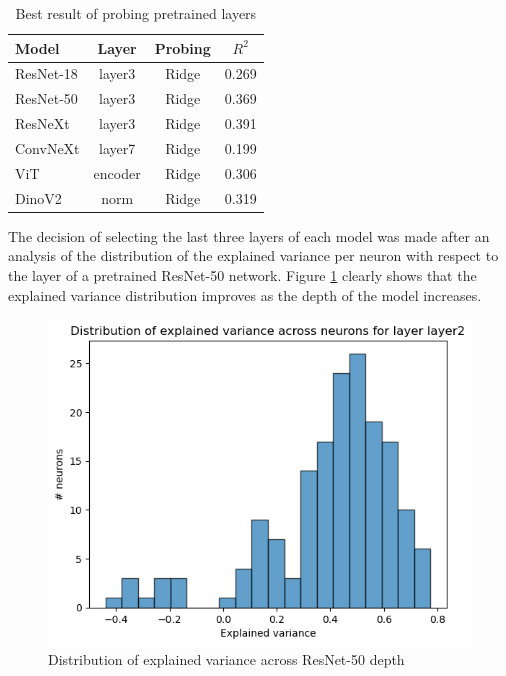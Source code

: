 \documentclass[10pt,conference,compsocconf]{IEEEtran}
\begin{document}
\begin{table}[h!]
    \centering
    \begin{tabular}{|l|c|c|c|}
        \hline
        Model & Layer & Probing & \(R^2\) \\
        \hline
        ResNet-18 & layer3 & Ridge & 0.269 \\
        ResNet-50 & layer3 & Ridge & 0.369 \\
        ResNeXt & layer3 & Ridge & 0.391 \\
        ConvNeXt & layer7 & Ridge & 0.199 \\
        ViT & encoder & Ridge & 0.306 \\
        DinoV2 & norm & Ridge & 0.319 \\
        \hline
    \end{tabular}
    \caption{Best result of probing pretrained layers}
    \label{table:pretrained}
\end{table}
\vspace*{-1.5em}

The decision of selecting the last three layers of each model was made after an analysis of the distribution of the explained variance per neuron with respect to the layer of a pretrained ResNet-50 network. Figure \ref{fig:explvar} clearly shows that the explained variance distribution improves as the depth of the model increases.

\begin{figure}[h!]
    \centering
    \includegraphics[width=0.8\columnwidth]{explvar.png}
    \caption{Distribution of explained variance across ResNet-50 depth}
    \label{fig:explvar}
\end{figure}
\FloatBarrier
\vspace*{-1.5em}
\end{document}
